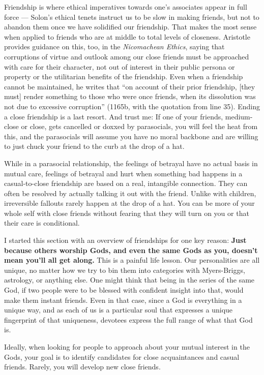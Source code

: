 \documentclass[
]{book}
\begin{document}
Friendship is where ethical imperatives towards one's associates appear in full force --- Solon's ethical tenets instruct us to be slow in making friends, but not to abandon them once we have solidified our friendship. That makes the most sense when applied to friends who are at middle to total levels of closeness. Aristotle provides guidance on this, too, in the \emph{Nicomachean Ethics}, saying that corruptions of virtue and outlook among our close friends must be approached with care for their character, not out of interest in their public persona or property or the utilitarian benefits of the friendship. Even when a friendship cannot be maintained, he writes that ``on account of their prior friendship, {[}they must{]} render something to those who were once friends, when its dissolution was not due to excessive corruption'' (1165b, with the quotation from line 35). Ending a close friendship is a last resort. And trust me: If one of your friends, medium-close or close, gets cancelled or doxxed by parasocials, you will feel the heat from this, and the parasocials will assume you have no moral backbone and are willing to just chuck your friend to the curb at the drop of a hat.

While in a parasocial relationship, the feelings of betrayal have no actual basis in mutual care, feelings of betrayal and hurt when something bad happens in a casual-to-close friendship are based on a real, intangible connection. They can often be resolved by actually talking it out with the friend. Unlike with children, irreversible fallouts rarely happen at the drop of a hat. You can be more of your whole self with close friends without fearing that they will turn on you or that their care is conditional.

I started this section with an overview of friendships for one key reason: \textbf{Just because others worship Gods, and even the same Gods as you, doesn't mean you'll all get along.} This is a painful life lesson. Our personalities are all unique, no matter how we try to bin them into categories with Myers-Briggs, astrology, or anything else. One might think that being in the series of the same God, if two people were to be blessed with confident insight into that, would make them instant friends. Even in that case, since a God is everything in a unique way, and as each of us is a particular soul that expresses a unique fingerprint of that uniqueness, devotees express the full range of what that God is.

Ideally, when looking for people to approach about your mutual interest in the Gods, your goal is to identify candidates for close acquaintances and casual friends. Rarely, you will develop new close friends.
\end{document}
